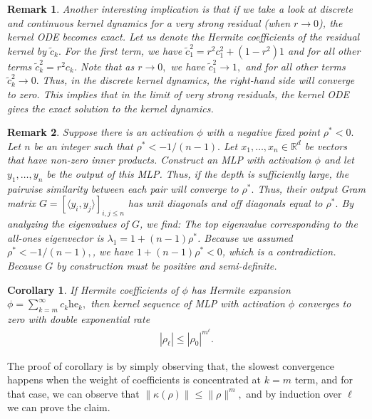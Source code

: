 \documentclass[twoside]{article}
\newcommand{\R}{\mathbb{R}}
\newcommand{\he}{\mathrm{he}}
\newtheorem{remark}{Remark}
\newtheorem{corollary}{Corollary}
\theoremstyle{definition}
\begin{document}
\begin{remark}\label{rem:residual_ODE}
    Another interesting implication is that if we take a look at discrete and continuous kernel dynamics for a very strong residual (when $r\to 0$), the kernel ODE becomes exact. Let us denote the Hermite coefficients of the residual kernel by $\tilde{c}_k.$ For the first term, we have $\tilde{c}_1^2 = r^2 c_1^2 + (1-r^2) 1$ and for all other terms $\tilde{c}_k^2 = r^2 c_k$. Note that as $r \to 0,$ we have $\tilde{c}_1^2\to 1,$ and for all other terms $\tilde{c}_k^2\to 0.$ Thus, in the discrete kernel dynamics, the right-hand side will converge to zero. This implies that in the limit of very strong residuals, the kernel ODE gives the exact solution to the kernel dynamics. 
\end{remark}

\begin{remark}\label{rem:no_negative_geometric}
    Suppose there is an activation $\phi$ with a negative fixed point $\rho^*<0.$ Let $n$ be an integer such that $\rho^* < -1/(n-1).$ Let $x_1,\dots, x_n\in \R^d$ be vectors that have non-zero inner products. Construct an MLP with activation $\phi$ and let $y_1,\dots, y_n$ be the output of this MLP. Thus, if the depth is sufficiently large, the pairwise similarity between each pair will converge to $\rho^*.$ Thus, their output Gram matrix $G = [\langle y_i,y_j\rangle]_{i,j\le n}$  has unit diagonals and off diagonals equal to $\rho^*.$ By analyzing the eigenvalues of $G$, we find: The top eigenvalue corresponding to the all-ones eigenvector is $\lambda_1 = 1 + (n-1)\rho^*$. Because we assumed $\rho^* < -1/(n-1),$, we have $1 + (n-1)\rho^* < 0$, which is a contradiction. Because $G$ by construction must be positive and semi-definite.  
\end{remark}

\begin{corollary}\label{cor:double_exp}
    If Hermite coefficients of $\phi$ has Hermite expansion $\phi = \sum_{k=m}^\infty c_k \he_k,$ then kernel sequence of MLP with activation $\phi$ converges to zero with double exponential rate 
    \begin{align*}
        |\rho_\ell| \le |\rho_0|^{m^\ell}.
    \end{align*}
\end{corollary}

The proof of corollary is by simply observing that, the slowest convergence happens when the weight of coefficients is concentrated at $k=m$ term, and for that case, we can observe that $\|\kappa(\rho)\|\le \|\rho\|^m,$ and by induction over $\ell$ we can prove the claim. 
\end{document}
